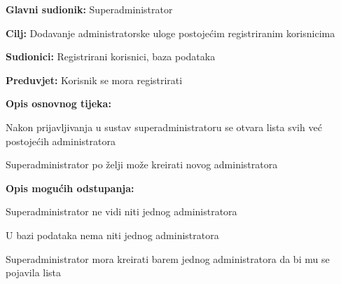 				\noindent {}
				\begin{packed_item}

					\item \textbf{Glavni sudionik: } Superadministrator
					\item  \textbf{Cilj:} Dodavanje administratorske uloge postojećim registriranim korisnicima
					\item  \textbf{Sudionici:} Registrirani korisnici, baza podataka
					\item  \textbf{Preduvjet:} Korisnik se mora registrirati
					\item  \textbf{Opis osnovnog tijeka:}

					\item[] \begin{packed_enum}

						\item Nakon prijavljivanja u sustav superadministratoru se otvara lista svih već postojećih administratora
						\item Superadministrator po želji može kreirati novog administratora
					\end{packed_enum}

					\item  \textbf{Opis mogućih odstupanja:}

					\item[] \begin{packed_item}

						\item[1.a] Superadministrator ne vidi niti jednog administratora
						\item[] \begin{packed_enum}

							\item U bazi podataka nema niti jednog administratora
							\item Superadministrator mora kreirati barem jednog administratora da bi mu se pojavila lista

						\end{packed_enum}

					\end{packed_item}
				\end{packed_item}

